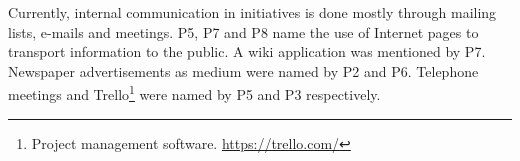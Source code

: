 Currently, internal communication in initiatives is done mostly through mailing lists, e-mails and meetings. P5, P7 and P8 name the use of Internet pages to transport information to the public. A wiki application was mentioned by P7. Newspaper advertisements as medium were named by P2 and P6. Telephone meetings and Trello\footnote{Project management software. \url{https://trello.com/}} were named by P5 and P3 respectively.

















